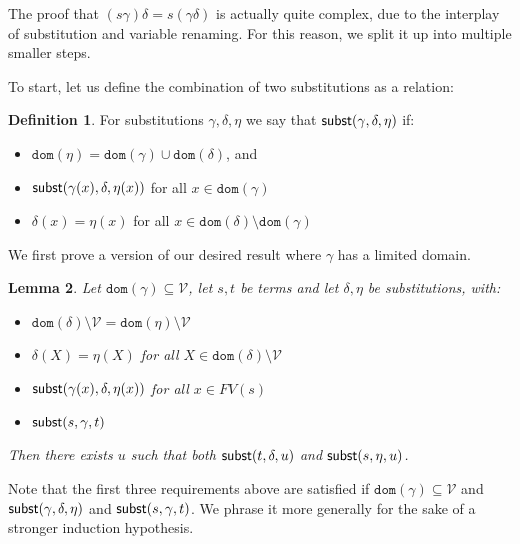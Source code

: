 \documentclass{lmcs}
\theoremstyle{theorem}\newtheorem{theorem}{Theorem}
\theoremstyle{theorem}\newtheorem{lemma}[theorem]{Lemma}
\theoremstyle{theorem}\newtheorem{corollary}[theorem]{Corollary}
\theoremstyle{definition}\newtheorem{definition}[theorem]{Definition}
\theoremstyle{definition}\newtheorem{example}[theorem]{Example}
\newcommand{\V}{\mathcal{V}}
\newcommand{\FV}{\mathit{FV}}
\newcommand{\domain}{\mathtt{dom}}
\newcommand{\avar}{x}
\newcommand{\Avar}{X}
\begin{document}
The proof that $(s\gamma)\delta = s(\gamma\delta)$ is actually quite complex,
due to the interplay of substitution and variable renaming.  For this reason,
we split it up into multiple smaller steps.

To start, let us define the combination of two substitutions as a relation:

\begin{definition}
For substitutions $\gamma,\delta,\eta$ we say that $\mathsf{subst}(\gamma,\delta,\eta)$
if:
\begin{itemize}
\item $\domain(\eta) = \domain(\gamma) \cup \domain(\delta)$, and
\item $\subrel{\gamma(\avar),\delta,\eta(\avar)}$ for all $\avar \in
  \domain(\gamma)$
\item $\delta(\avar) = \eta(\avar)$ for all $\avar \in \domain(\delta) \setminus
  \domain(\gamma)$
\end{itemize}
\end{definition}

We first prove a version of our desired result where $\gamma$ has a limited
domain.

\begin{lemma}\label{lem:combinesubst:allbound}
Let $\domain(\gamma) \subseteq \V$, let $s,t$ be terms and let
$\delta,\eta$ be substitutions, with:
\begin{itemize}
\item $\domain(\delta) \setminus \V = \domain(\eta) \setminus \V$
\item $\delta(\Avar) = \eta(\Avar)$ for all $\Avar \in \domain(\delta) \setminus
  \V$
\item $\subrel{\gamma(\avar),\delta,\eta(\avar)}$ for all $\avar \in \FV(s)$
\item $\mathsf{subst}(s,\gamma,t)$
\end{itemize}
Then there exists $u$ such that both $\mathsf{subst}(t,\delta,u)$ and
$\mathsf{subst}(s,\eta,u)$.
\end{lemma}

Note that the first three requirements above are satisfied if $\domain(\gamma)
\subseteq \V$ and $\mathsf{subst}(\gamma,\delta,\eta)$ and $\mathsf{subst}(s,\gamma,t)$.  We
phrase it more generally for the sake of a stronger induction hypothesis.
\end{document}
